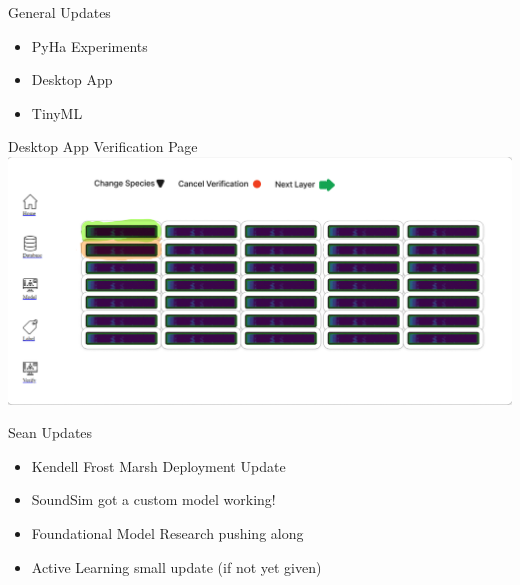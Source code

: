 

\begin{frame}{General Updates}
    \begin{itemize}
        \item PyHa Experiments
        \item Desktop App
        \item TinyML
    \end{itemize}    
\end{frame}

\begin{frame}{Desktop App Verification Page}
    \centering
    \includegraphics[height=0.7\textheight,width=1\textwidth,keepaspectratio]{images/Desktop_app_verification.png}
\end{frame}

\begin{frame}{Sean Updates}
    \begin{itemize}
        \item Kendell Frost Marsh Deployment Update
        \item SoundSim got a custom model working!
        \item Foundational Model Research pushing along
        \item Active Learning small update (if not yet given)
    \end{itemize}    
\end{frame}



